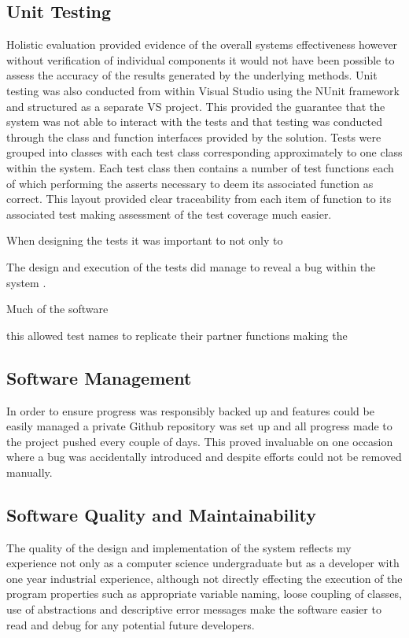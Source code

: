 \subsection{Unit Testing}
Holistic evaluation provided evidence of the overall systems effectiveness however without verification of individual components it would not have been possible to assess the accuracy of the results generated by the underlying methods. Unit testing was also conducted from within Visual Studio using the NUnit framework and structured as a separate VS project. This provided the guarantee that the system was not able to interact with the tests and that testing was conducted through the class and function interfaces provided by the solution. Tests were grouped into classes with each test class corresponding approximately to one class within the system. Each test class then contains a number of test functions each of which performing the asserts necessary to deem its associated function as correct. This layout provided clear traceability from each item of function to its associated test making assessment of the test coverage much easier.

When designing the tests it was important to not only to 

The design and execution of the tests did manage to reveal a bug within the system . 

Much of the software

 this allowed test names to replicate their partner functions making the 




\subsection{Software Management}
In order to ensure progress was responsibly backed up and features could be easily managed a private Github repository was set up and all progress made to the project pushed every couple of days. This proved invaluable on one occasion where a bug was accidentally introduced and despite efforts could not be removed manually. 
 



\subsection{Software Quality and Maintainability}
The quality of the design and implementation of the system reflects my experience not only as a computer science undergraduate but as a developer with one year industrial experience, although not directly effecting the execution of the program properties such as appropriate variable naming, loose coupling of classes, use of abstractions and descriptive error messages make the software easier to read and debug for any potential future developers. 

